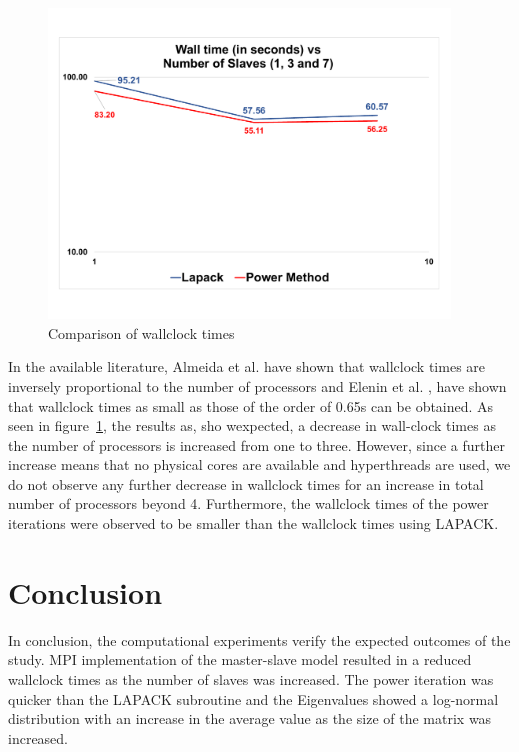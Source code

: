 \documentclass[11pt, oneside]{article}
\begin{document}
                \begin{figure}[h]
		\centering
		\includegraphics[width=0.95\textwidth]{Figures/wtime_slaves.pdf}
		\caption{Comparison of wallclock times}
		\label{fig:walltime2}
	        \end{figure}

                

 In the available literature, Almeida et al. \cite{Almeida:2013:MEC:2509348.2509354} have shown that wallclock times are inversely proportional to the number of processors and Elenin et al. \cite{Elenin2013EvaluationOM}, have shown that wallclock times as small as those of the order of 0.65s can be obtained.  As seen in figure~\ref{fig:walltime2}, the results as, sho wexpected, a decrease in wall-clock times as the number of processors is increased from one to three. However, since a further increase means that no physical cores are available and hyperthreads are used, we do not observe any further decrease in wallclock times for an increase in total number of processors beyond 4. Furthermore, the wallclock times of the  power iterations were observed to be smaller than the wallclock times using LAPACK.


\section{Conclusion}
In conclusion, the computational experiments verify the expected outcomes of the study. MPI implementation of the master-slave model resulted in a reduced wallclock times as the number of slaves was increased. The power iteration was quicker than the LAPACK subroutine and the Eigenvalues showed a log-normal distribution with an increase in the average value as the size of the matrix was increased.      

\newpage



\end{document}
